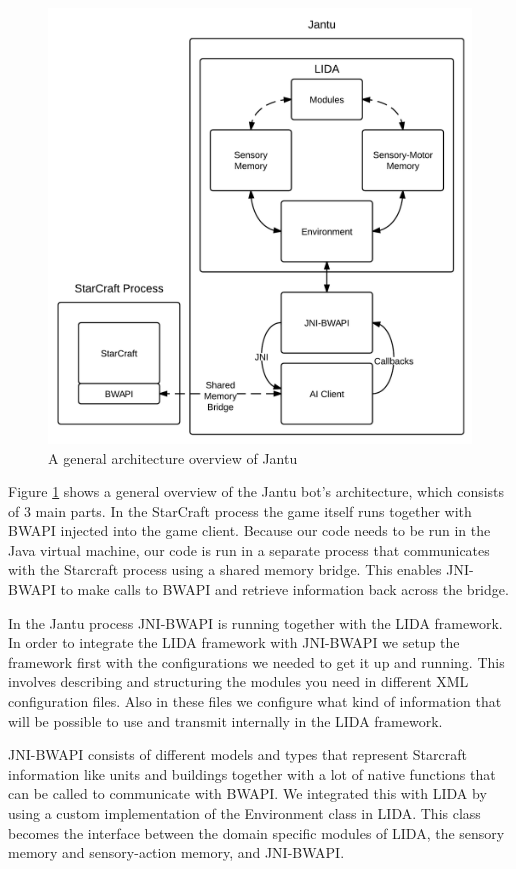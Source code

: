 \begin{figure}[h!tb]
\centering
\includegraphics[scale=1.0]{graphics/jantu.png}
\caption{A general architecture overview of Jantu}
\label{fig:jantu}
\end{figure}

Figure \ref{fig:jantu} shows a general overview of the Jantu bot's architecture, which consists of 3 main parts. In the StarCraft process the game itself runs together with BWAPI injected into the game client. Because our code needs to be run in the Java virtual machine, our code is run in a separate process that communicates with the Starcraft process using a shared memory bridge. This enables JNI-BWAPI to make calls to BWAPI and retrieve information back across the bridge. 

In the Jantu process JNI-BWAPI is running together with the LIDA framework. In order to integrate the LIDA framework with JNI-BWAPI we setup the framework first with the configurations we needed to get it up and running. This involves describing and structuring the modules you need in different XML configuration files. Also in these files we configure what kind of information that will be possible to use and transmit internally in the LIDA framework.

JNI-BWAPI consists of different models and types that represent Starcraft information like units and buildings together with a lot of native functions that can be called to communicate with BWAPI. We integrated this with LIDA by using a custom implementation of the Environment class in LIDA. This class becomes the interface between the domain specific modules of LIDA, the sensory memory and sensory-action memory, and JNI-BWAPI. 


